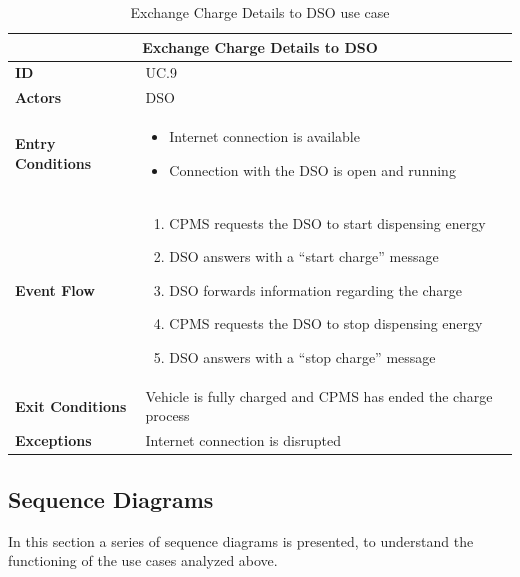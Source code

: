 \documentclass[12pt]{report}
\begin{document}
    \begin{table}[h]
    \centering
        \begin{tabular}{ |p{4cm}|p{11cm}|  }
        \hline
        \multicolumn{2}{|c|}{\textbf{Exchange Charge Details to DSO}} \\
        \hline
            \textbf{ID} &  UC.9\\
        \hline
            \textbf{Actors} & DSO\\
        \hline
            \textbf{Entry Conditions} &
                \begin{itemize}
                    \item Internet connection is available
                    \item Connection with the DSO is open and running
                \end{itemize}\\
        \hline
            \textbf{Event Flow} &
                \begin{enumerate}
                    \item CPMS requests the DSO to start dispensing energy
                    \item DSO answers with a “start charge” message
                    \item DSO forwards information regarding the charge
                    \item CPMS requests the DSO to stop dispensing energy
                    \item DSO answers with a “stop charge” message
                \end{enumerate}\\
        \hline
            \textbf{Exit Conditions} & Vehicle is fully charged and CPMS has ended the charge process\\
        \hline
            \textbf{Exceptions} & Internet connection is disrupted\\
        \hline
        \end{tabular}
        \caption{\label{demo-table}Exchange Charge Details to DSO use case}
    \end{table}
\clearpage
\newpage
\newpage
\newpage
\newpage
\subsection{Sequence Diagrams}
In this section a series of sequence diagrams is presented, to understand the functioning of the use cases analyzed above.
    
\end{document}
